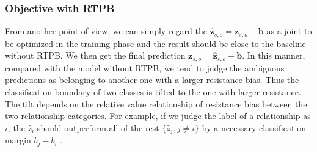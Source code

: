 %

\subsubsection{Objective with RTPB}
From another point of view, we can simply regard the $\hat{\mathbf{z}}_{s,o} = \mathbf{z}_{s,o} - \mathbf{b}$  as a joint to be optimized in the training phase and the result should be close to the baseline without RTPB. We then get the final prediction $ \mathbf{z}_{s,o} =\hat{\mathbf{z}}_{s,o} + \mathbf{b}$. In this manner, compared with the model without RTPB, we tend to judge the ambiguous predictions as belonging to another one with a larger resistance bias. Thus the classification boundary of two classes is tilted to the one with larger resistance. The tilt depends on the relative value relationship of resistance bias between the two relationship categories. For example, if we judge the label of a relationship as $i$, the $\hat{z}_{i}$ should outperform all of the rest $\{\hat{z}_j, j\neq i\}$ by a necessary classification margin $b_j - b_i$ .

